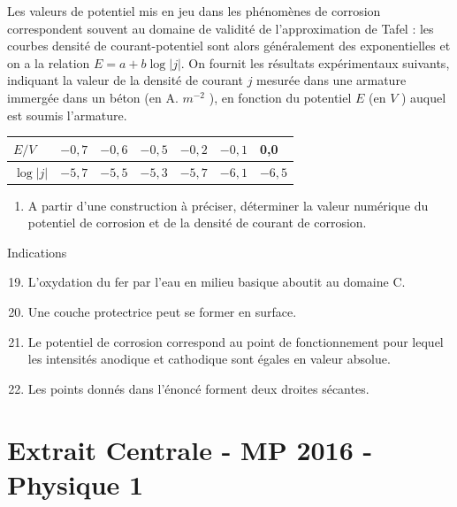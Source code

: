 Les valeurs de potentiel mis en jeu dans les phénomènes de corrosion correspondent souvent au domaine de validité de l'approximation de Tafel : les courbes densité de courant-potentiel sont alors généralement des exponentielles et on a la relation $E=a+b \log |j|$.
On fournit les résultats expérimentaux suivants, indiquant la valeur de la densité de courant $j$ mesurée dans une armature immergée dans un béton (en A. $m^{-2}$ ), en fonction du potentiel $E$ (en $V$ ) auquel est soumis l'armature.
\begin{center}
\begin{tabular}{|l|l|l|l|l|l|l|}
\hline$E / V$ & $-0,7$ & $-0,6$ & $-0,5$ & $-0,2$ & $-0,1$ & 0,0 \\
\hline $\log |j|$ & $-5,7$ & $-5,5$ & $-5,3$ & $-5,7$ & $-6,1$ & $-6,5$ \\
\hline
\end{tabular}
\end{center}

\begin{enumerate}[resume]
\item \dur A partir d'une construction à préciser, déterminer la valeur numérique du potentiel de corrosion et de la densité de courant de corrosion.
\end{enumerate}



\begin{bclogo}[logo=\bcoutil , noborder=True, couleur=yellow!10!white]{\hfill{Indications }}

\begin{enumerate}
  \setcounter{enumi}{18}
\item L'oxydation du fer par l'eau en milieu basique aboutit au domaine C.
\item Une couche protectrice peut se former en surface.
\item Le potentiel de corrosion correspond au point de fonctionnement pour lequel les intensités anodique et cathodique sont égales en valeur absolue.
\item Les points donnés dans l'énoncé forment deux droites sécantes.
\end{enumerate}

\end{bclogo}




\newpage
\section*{Extrait Centrale - MP 2016 - Physique 1}


